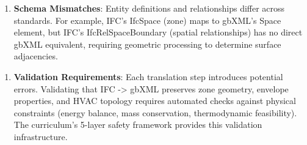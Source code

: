 \documentclass[12pt,a4paper]{article}
\begin{document}
\begin{enumerate}[resume]
  \item \textbf{Schema Mismatches}: Entity definitions and relationships differ across standards. For example, IFC's IfcSpace (zone) maps to gbXML's Space element, but IFC's IfcRelSpaceBoundary (spatial relationships) has no direct gbXML equivalent, requiring geometric processing to determine surface adjacencies.
\end{enumerate}
\begin{enumerate}[resume]
  \item \textbf{Validation Requirements}: Each translation step introduces potential errors. Validating that IFC -> gbXML preserves zone geometry, envelope properties, and HVAC topology requires automated checks against physical constraints (energy balance, mass conservation, thermodynamic feasibility). The curriculum's 5-layer safety framework provides this validation infrastructure.
\end{enumerate}
\end{document}
